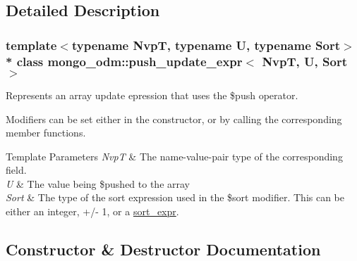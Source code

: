 \subsection{Detailed Description}
\subsubsection*{template$<$typename NvpT, typename U, typename Sort$>$\\*
class mongo\+\_\+odm\+::push\+\_\+update\+\_\+expr$<$ Nvp\+T, U, Sort $>$}

Represents an array update epression that uses the \$push operator. 

Modifiers can be set either in the constructor, or by calling the corresponding member functions. 
\begin{DoxyTemplParams}{Template Parameters}
{\em NvpT} & The name-\/value-\/pair type of the corresponding field. \\
\hline
{\em U} & The value being \$push\textquotesingle{}ed to the array \\
\hline
{\em Sort} & The type of the sort expression used in the \$sort modifier. This can be either an integer, +/-\/ 1, or a \hyperlink{classmongo__odm_1_1sort__expr}{sort\+\_\+expr}. \\
\hline
\end{DoxyTemplParams}


\subsection{Constructor \& Destructor Documentation}
